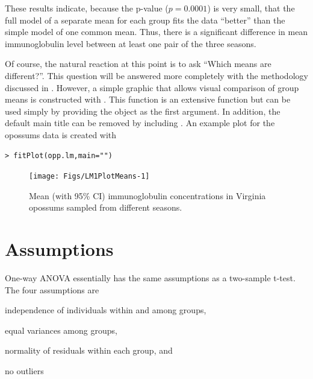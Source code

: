 \documentclass[10pt,openany]{book}\usepackage[]{graphicx}\usepackage[]{color}
\makeatletter
\newenvironment{kframe}{%
 \def\at@end@of@kframe{}%
 \ifinner\ifhmode%
  \def\at@end@of@kframe{\end{minipage}}%
  \begin{minipage}{\columnwidth}%
 \fi\fi%
 \def\FrameCommand##1{\hskip\@totalleftmargin \hskip-\fboxsep
 \colorbox{shadecolor}{##1}\hskip-\fboxsep
     \hskip-\linewidth \hskip-\@totalleftmargin \hskip\columnwidth}%
 \MakeFramed {\advance\hsize-\width
   \@totalleftmargin\z@ \linewidth\hsize
   \@setminipage}}%
 {\par\unskip\endMakeFramed%
 \at@end@of@kframe}
\newenvironment{knitrout}{}{} %
\makeatother
\begin{document}
These results indicate, because the p-value ($p=0.0001$) is very small, that the full model of a separate mean for each group fits the data ``better'' than the simple model of one common mean.  Thus, there is a significant difference in mean immunoglobulin level between at least one pair of the three seasons.

Of course, the natural reaction at this point is to ask ``Which means are different?''.  This question will be answered more completely with the methodology discussed in .  However, a simple graphic that allows visual comparison of group means is constructed with .  This function is an extensive function but can be used simply by providing the  object as the first argument.  In addition, the default main title can be removed by including .  An example plot for the opossums data  is created with

\begin{knitrout}
\color{fgcolor}\begin{kframe}
\begin{verbatim}
> fitPlot(opp.lm,main="")
\end{verbatim}


{\ttfamily\noindent\itshape\color{messagecolor}{Loading required namespace: sciplot}}\end{kframe}\begin{figure}[hbtp]

{\centering \texttt{[image: Figs/LM1PlotMeans-1]} 

}

\caption[Mean (with 95\% CI) immunoglobulin concentrations in Virginia opossums sampled from different seasons]{Mean (with 95\% CI) immunoglobulin concentrations in Virginia opossums sampled from different seasons.}\label{fig:LM1PlotMeans}
\end{figure}


\end{knitrout}

\section{Assumptions} \label{sect:OWAAssumptions}
One-way ANOVA essentially has the same assumptions as a two-sample t-test.  The four assumptions are
\begin{Enumerate}
  \item independence of individuals within and among groups,
  \item equal variances among groups,
  \item normality of residuals within each group, and
  \item no outliers
\end{Enumerate}
\end{document}
